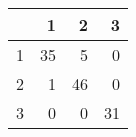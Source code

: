 \begin{tabular}{rrrr}
  \hline
 & 1 & 2 & 3 \\ 
  \hline
1 &  35 &   5 &   0 \\ 
  2 &   1 &  46 &   0 \\ 
  3 &   0 &   0 &  31 \\ 
   \hline
\end{tabular}
